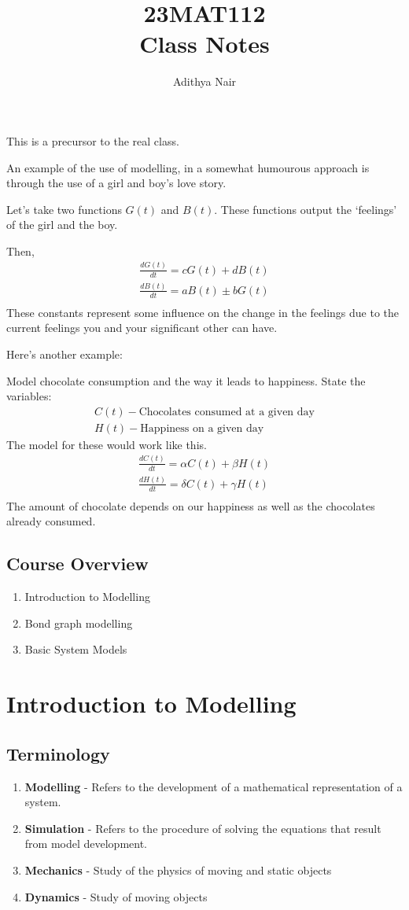 \documentclass[twoside]{report}
\title{\Huge{23MAT112}\\ Class Notes}
\author{\huge{Adithya Nair}}
\date{}
\begin{document}
This is a precursor to the real class.

An example of the use of modelling, in a somewhat humourous approach is through the use of a girl and boy's love story.

Let's take two functions $G(t)$ and $B(t)$. These functions output the `feelings' of the girl and the boy.

Then,
\begin{align*}
	\frac{dG(t)}{dt} = cG(t) + dB(t) \\
	\frac{dB(t)}{dt} = aB(t) \pm bG(t) \\
\end{align*}
These constants represent some influence on the change in the feelings due to the current feelings you and your significant other can have.

Here's another example:

Model chocolate consumption and the way it leads to happiness.
State the variables:
\begin{align*}
	C(t) - \text{Chocolates consumed at a given day}\\
	H(t) - \text{Happiness on a given day}
\end{align*}
The model for these would work like this.
\begin{align*}
	\frac{dC(t)}{dt} = \alpha C(t) + \beta H(t) \\
	\frac{dH(t)}{dt} = \delta C(t) + \gamma H(t) \\
\end{align*}
The amount of chocolate depends on our happiness as well as the chocolates already consumed.
\section{Course Overview}
\begin{enumerate}
	\item Introduction to Modelling
	\item Bond graph modelling
	\item Basic System Models
\end{enumerate}
\chapter{Introduction to Modelling}
\section{Terminology}
\begin{enumerate}
	\item \textbf{Modelling} - Refers to the development of a mathematical representation of a system.

	\item \textbf{Simulation} - Refers to the procedure of solving the equations that result from model development.
	\item \textbf{Mechanics} - Study of the physics of moving and static objects 
	\item \textbf{Dynamics} - Study of moving objects
\end{enumerate}
\end{document}
